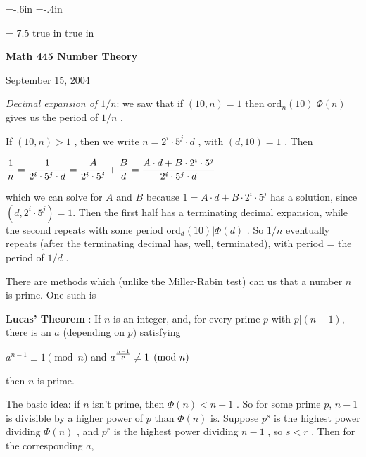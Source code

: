 
%





\nopagenumbers
\parindent=0pt
\voffset=-.6in
\hoffset=-.4in

\hsize = 7.5 true in
 true in

\overfullrule=0pt


\def\ctln{\centerline}
\def\u{\underbar}
\def\ssk{\smallskip}
\def\msk{\medskip}
\def\bsk{\bigskip}


\ctln{\bf Math 445 Number Theory}

\medskip

\ctln{September 15, 2004}

\bigskip

{\it Decimal 
expansion of $1/n$}: we saw that if $(10,n)=1$ then ord$_n(10)|\Phi(n)$ gives us the period
of $1/n$ . 

\ssk

If $(10,n)>1$ , then we write $n=2^i\cdot 5^j\cdot d$ , with $(d,10)=1$ . Then 

\ssk

\ctln{$\displaystyle{{1}\over{n}} = {{1}\over{2^i\cdot 5^j\cdot d}} = {{A}\over{2^i\cdot 5^j}}+{{B}\over{d}} = {{A\cdot d+B\cdot 2^i\cdot 5^j}\over{2^i\cdot 5^j\cdot d}}$}

\ssk

which we can solve for $A$ and $B$ because $1=A\cdot d+B\cdot 2^i\cdot 5^j$ has a solution, since $(d,2^i\cdot 5^j)=1$. Then the first half has
a terminating decimal expansion, while the second repeats with some period ord$_d(10)|\Phi(d)$ . So $1/n$ eventually repeats (after the terminating
decimal has, well, terminated), with period = the period of $1/d$ .

\bsk

There are methods which (unlike the Miller-Rabin test) can  us that a number $n$ is prime. One such is

\msk

{\bf Lucas' Theorem} : If $n$ is an integer, and, for every prime $p$ with $p|(n-1)$, there is an $a$ (depending on $p$) satisfying

\ssk

\ctln{$\displaystyle a^{n-1}\equiv 1\pmod{n}$ and $\displaystyle a^{{n-1}\over{p}}\not\equiv 1\pmod{n}$}

\ssk

then $n$ is prime.

\msk

The basic idea: if $n$ isn't prime, then $\Phi(n)<n-1$ . So for some prime $p$, $n-1$ is divisible by a  higher power of $p$ than $\Phi(n)$ is. 
Suppose $p^s$ is the highest power dividing $\Phi(n)$ , and $p^r$ is the highest power dividing $n-1$ , so $s<r$ . Then for the corresponding
$a$, 

